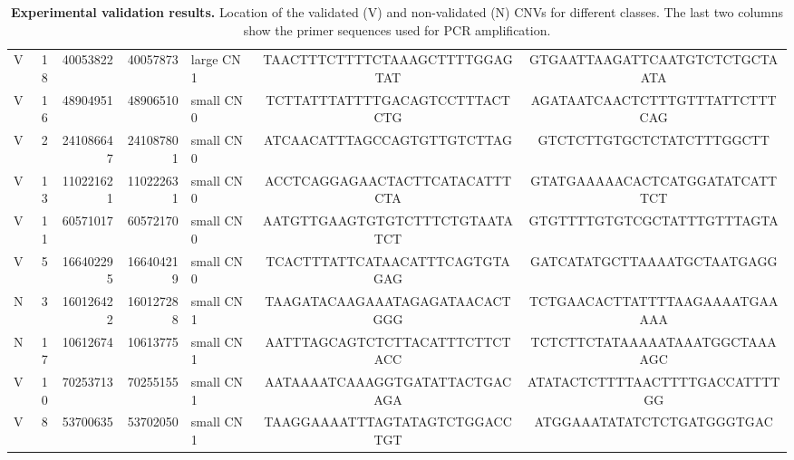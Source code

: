 \begin{table}[htp]
{\begin{tabular}{|c|r|r|r|l|c|c|}
      V      & 18   & 40053822  & 40057873  & large CN 1   & TAACTTTCTTTTCTAAAGCTTTTGGAGTAT & GTGAATTAAGATTCAATGTCTCTGCTAATA \\
      V      & 16   & 48904951  & 48906510  & small CN 0   & TCTTATTTATTTTGACAGTCCTTTACTCTG & AGATAATCAACTCTTTGTTTATTCTTTCAG \\
      V      & 2    & 241086647 & 241087801 & small CN 0   & ATCAACATTTAGCCAGTGTTGTCTTAG    & GTCTCTTGTGCTCTATCTTTGGCTT      \\
      V      & 13   & 110221621 & 110222631 & small CN 0   & ACCTCAGGAGAACTACTTCATACATTTCTA & GTATGAAAAACACTCATGGATATCATTTCT \\
      V      & 11   & 60571017  & 60572170  & small CN 0   & AATGTTGAAGTGTGTCTTTCTGTAATATCT & GTGTTTTGTGTCGCTATTTGTTTAGTA    \\
      V      & 5    & 166402295 & 166404219 & small CN 0   & TCACTTTATTCATAACATTTCAGTGTAGAG & GATCATATGCTTAAAATGCTAATGAGG    \\
      N     & 3    & 160126422 & 160127288 & small CN 1   & TAAGATACAAGAAATAGAGATAACACTGGG & TCTGAACACTTATTTTAAGAAAATGAAAAA \\
      N     & 17   & 10612674  & 10613775  & small CN 1   & AATTTAGCAGTCTCTTACATTTCTTCTACC & TCTCTTCTATAAAAATAAATGGCTAAAAGC \\
      V      & 10   & 70253713  & 70255155  & small CN 1   & AATAAAATCAAAGGTGATATTACTGACAGA & ATATACTCTTTTAACTTTTGACCATTTTGG \\
      V      & 8    & 53700635  & 53702050  & small CN 1   & TAAGGAAAATTTAGTATAGTCTGGACCTGT & ATGGAAATATATCTCTGATGGGTGAC     \\
      \hline
    \end{tabular}
  }
  \caption[Experimental validation results.]{{\bf Experimental validation results.} {\small Location of the validated (V) and non-validated (N) CNVs for different classes. The last two columns show the primer sequences used for PCR amplification.}}
  \label{tab:pcr}
\end{table}

